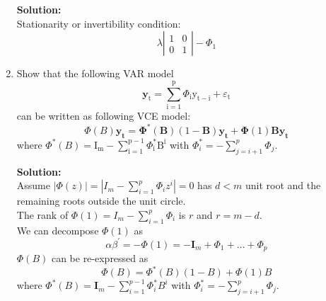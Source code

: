 \documentclass{article}
\begin{document}
\begin{enumerate}
	\textbf{Solution:}\\
	Stationarity or invertibility condition:
	\begin{equation*}
	\lambda \left| \begin{array}{cc} 1 & 0 \\ 0 & 1\end{array}\right| - \Phi_1
	\end{equation*}
	
	\item Show that the following VAR model
	\begin{equation*}
	\mathbf{y}_{\mathrm{t}}=\sum_{\mathrm{i}=1}^{\mathrm{p}} \Phi_{\mathrm{i}} \mathrm{y}_{\mathrm{t}-\mathrm{i}}+\varepsilon_{\mathrm{t}}
	\end{equation*}
	can be written as following VCE model:
	\begin{equation*}
	\Phi(B) \mathbf{y}_{\mathbf{t}}=\mathbf{\Phi}^{*}(\mathbf{B})(1-\mathbf{B}) \mathbf{y}_{\mathbf{t}}+\mathbf{\Phi}(1) \mathbf{B} \mathbf{y}_{\mathbf{t}}
	\end{equation*}
	where $\Phi^{*}(B)=\mathrm{I}_{\mathrm{m}}-\sum_{\mathrm{i}=1}^{\mathrm{p}-1} \Phi_{\mathrm{i}}^{*} \mathrm{B}^{\mathrm{i}}$ with $\Phi_{i}^{*}=-\sum_{j=i+1}^{p} \Phi_{j}$.
	
	\textbf{Solution:}\\
	Assume $|\Phi(z)|=\left|I_{m}-\sum_{i=1}^{p} \Phi_{i} z^{i}\right|=0$ has $d < m$ unit root and the
	remaining roots outside the unit circle.\\
	The rank of $\Phi(1)=I_{m}-\sum_{i=1}^{p} \Phi_{i}$ is $r$ and $r = m -d$.\\
	We can decompose $\Phi(1)$ as
	\begin{equation*}
	\alpha \beta^{\prime}=-\Phi(1)=-\mathbf{I}_{m}+\Phi_{1}+\ldots+\Phi_{p}
	\end{equation*}
	$\Phi(B)$ can be re-expressed as
	\begin{equation*}
	\Phi(B)=\Phi^{*}(B)(1-B)+\Phi(1) B
	\end{equation*}
	where $\Phi^{*}(B)=\mathbf{I}_{m}-\sum_{i=1}^{p-1} \Phi_{i}^{*} B^{i}$ with $\Phi_{i}^{*}=-\sum_{j=i+1}^{p} \Phi_{j}$.
	

\end{enumerate}
\end{document}
